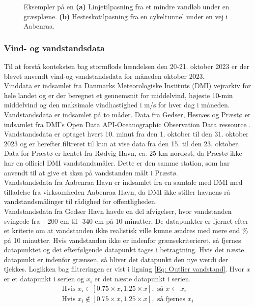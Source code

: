 \begin{figure}[H]
\begin{subfigure}[b]{0.5\textwidth}
        \caption{}
        \label{Subfig: Hesteskotilpasning}
    \end{subfigure}
    \caption{Eksempler på en \textbf{(a)} Linjetilpasning fra et mindre vandløb under en græsplæne. \textbf{(b)} Hesteskotilpasning fra en cykeltunnel under en vej i Aabenraa.}
    \label{Figur: Linje- og hesteskotilpasninger}
\end{figure}


\subsubsection{Vind- og vandstandsdata} \label{Vind- og vandstandsdata}
Til at forstå konteksten bag stormflods hændelsen den 20-21. oktober 2023 er der blevet anvendt vind-og vandstandsdata for måneden oktober 2023. \\
Vinddata er indsamlet fra Danmarks Meteorologiske Instituts (DMI) vejrarkiv \citep{dmi_vejrarkiv} for hele landet og er der beregnet et gennemsnit for middelvind, højeste 10-min middelvind og den maksimale vindhastighed i m/s for hver dag i måneden. \\

Vandstandsdata er indsamlet på to måder. Data fra Gedser, Hesnæs og Præstø er indsamlet fra DMI's Open Data API-Oceanographic Observation Data ressource \citep{dmi_open_data}. Vandstandsdata er optaget hvert 10. minut fra den 1. oktober til den 31. oktober 2023 og er herefter filtreret til kun at vise data fra den 15. til den 23. oktober. Data for Præstø er hentet fra Rødvig Havn, ca. 25 km nordøst, da Præstø ikke har en officiel DMI vandstandsmåler. Dette er den samme station, som \cite{cowi_praesto_2025} har anvendt til at give et skøn på vandstanden målt i Præstø. \\
Vandstandsdata fra Aabenraa Havn er indsamlet fra en samtale med DMI med tilladelse fra virksomheden Aabenraa Havn, da DMI ikke stiller havnens rå vandstandsmålinger til rådighed for offentligheden.\\

Vandstandsdata fra Gedser Havn havde en del afvigelser, hvor vandstanden svingede fra +200 cm til -340 cm på 10 minutter. De datapunkter er fjernet efter et kriterie om at vandstanden ikke realistisk ville kunne ændres med mere end \% på 10 minutter. Hvis vandstanden ikke er indenfor grænsekriterieret, så fjernes datapunktet og det efterfølgende datapunkt tages i betragtning. Hvis det næste datapunkt er indenfor grænsen, så bliver det datapunkt den nye værdi der tjekkes. Logikken bag filtreringen er vist i ligning \ref{Eq: Outlier vandstand}. Hvor $x$ er et datapunkt i serien og $x_i$ er det næste datapunkt i serien.
\begin{align} \label{Eq: Outlier vandstand}
    \text{Hvis } x_i \in [0.75\times x, 1.25\times x], \text{ så } x \leftarrow x_i \nonumber \\
    \text{Hvis } x_i \notin [0.75\times x, 1.25\times x], \text{ så fjernes } x_i
\end{align}

